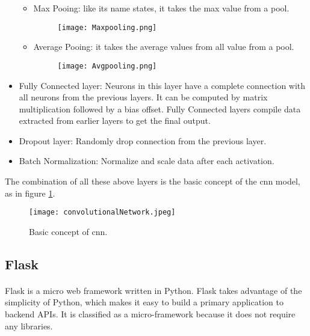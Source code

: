 \begin{itemize}
    \begin{itemize}
        \item Max Pooing: like its name states, it takes the max value from a pool.
        \begin{figure}[H]
            \centering
            \texttt{[image: Maxpooling.png]}
        \end{figure}
        
        \item Average Pooing: it takes the average values from all value from a pool.
        \begin{figure}[H]
            \centering
            \texttt{[image: Avgpooling.png]}
        \end{figure}
    \end{itemize}
    
    \item {Fully Connected layer}: Neurons in this layer have a complete connection with all neurons from the previous layers. It can be computed by matrix multiplication followed by a bias offset. Fully Connected layers compile data extracted from earlier layers to get the final output.

    \item {Dropout layer}: Randomly drop connection from the previous layer.
    
    \item {Batch Normalization}: Normalize and scale data after each activation.
    
\end{itemize}

The combination of all these above layers is the basic concept of the \acrshort{cnn} model, as in figure \ref{fig:cnnDesign}.

\begin{figure}[H]
    \centering
    \texttt{[image: convolutionalNetwork.jpeg]}
    \caption{Basic concept of \acrshort{cnn}.}
    \label{fig:cnnDesign}
\end{figure}

\subsection{Flask}
\paragraph{}
Flask is a micro web framework written in Python. Flask takes advantage of the simplicity of Python, which makes it easy to build a primary application to backend APIs. It is classified as a micro-framework because it does not require any libraries. 

